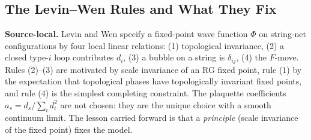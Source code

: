 
\subsection{The Levin--Wen Rules and What They Fix}

\textbf{Source-local.}  Levin and Wen specify a fixed-point wave function
\(\Phi\) on string-net configurations by four local linear relations:
(1) topological invariance, (2) a closed type-\(i\) loop contributes
\(d_i\), (3) a bubble on a string is \(\delta_{ij}\), (4) the \(F\)-move.
Rules (2)--(3) are motivated by scale invariance of an RG fixed point, rule
(1) by the expectation that topological phases have topologically invariant
fixed points, and rule (4) is the simplest completing constraint.  The
plaquette coefficients \(a_s=d_s/\sum_i d_i^2\) are not chosen: they are the
unique choice with a smooth continuum limit.  The lesson carried forward is
that a \emph{principle} (scale invariance of the fixed point) fixes the model.

